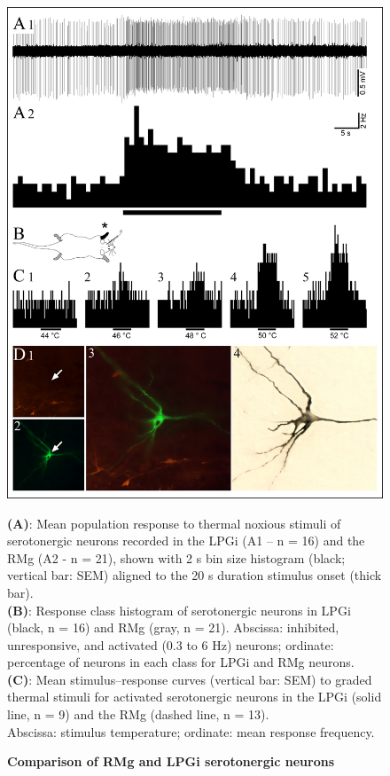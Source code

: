 \documentclass[a4paper,12pt,twoside]{report}
\begin{document}
\begin{figure}[p]

\begin{center}
 \includegraphics[scale=0.85]{Article3-FIG4.jpg} 
\end{center}

\caption{\textbf{Comparison of RMg and LPGi serotonergic neurons}}

{\protect\parbox[t]{18cm}{
\begin{small}
\textbf{(A)}: Mean population response to thermal noxious stimuli of serotonergic neurons recorded in the LPGi (A1 – n = 16) and the RMg (A2 - n = 21), shown with 2 s bin size histogram (black; vertical bar: SEM) aligned to the 20 s duration stimulus onset (thick bar).\\
\textbf{(B)}: Response class histogram of serotonergic neurons in LPGi (black, n = 16) and RMg (gray, n = 21). 
Abscissa: inhibited, unresponsive, and activated (0.3 to 6 Hz) neurons; ordinate: percentage of neurons in each class for LPGi and RMg neurons.\\
\textbf{(C)}: Mean stimulus–response curves (vertical bar: SEM) to graded thermal stimuli for activated serotonergic neurons in the LPGi (solid line, n = 9) and the RMg (dashed line, n = 13).\\
Abscissa: stimulus temperature; ordinate: mean response frequency.
\end{small}}}

\label{Article3-FIG4}

\end{figure}
\end{document}
